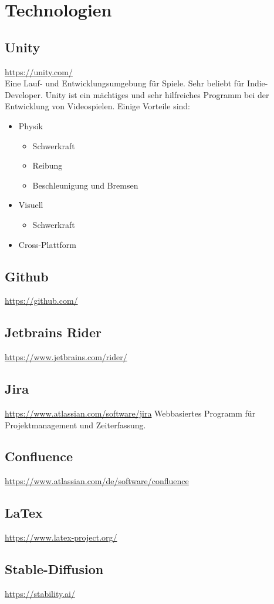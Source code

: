 \chapter{Technologien}

\section{Unity}
\url{https://unity.com/}\\
Eine Lauf- und Entwicklungsumgebung für Spiele.
Sehr beliebt für Indie-Developer. 
Unity ist ein mächtiges und sehr hilfreiches Programm bei der Entwicklung von Videospielen. Einige Vorteile sind:
\begin{itemize}
    \item Physik
    \begin{itemize}
        \item Schwerkraft
        \item Reibung
        \item Beschleunigung und Bremsen
    \end{itemize}
    \item Visuell
    \begin{itemize}
        \item Schwerkraft
    \end{itemize}
    \item Cross-Plattform
\end{itemize}

\section{Github}
\url{https://github.com/}

\section{Jetbrains Rider}
\url{https://www.jetbrains.com/rider/}

\section{Jira}
\url{https://www.atlassian.com/software/jira}
Webbasiertes Programm für Projektmanagement und Zeiterfassung.

\section{Confluence}
\url{https://www.atlassian.com/de/software/confluence}

\section{LaTex}
\url{https://www.latex-project.org/}

\section{Stable-Diffusion}
\url{https://stability.ai/}

